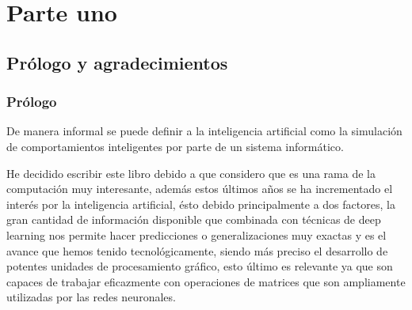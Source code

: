 \documentclass[11pt,fleqn]{book} %
\begin{document}


\pagestyle{empty} %

\tableofcontents %


\pagestyle{fancy} %


\part{Parte uno}



\chapter{Prólogo y agradecimientos}

\section{Prólogo}

De manera informal se puede definir a la inteligencia artificial como la simulación de comportamientos inteligentes por parte de un sistema informático.

He decidido escribir este libro debido a que considero que es una rama de la computación muy interesante, además estos últimos años se ha incrementado el interés por la inteligencia artificial, ésto debido principalmente a dos factores, la gran cantidad de información disponible que combinada con técnicas de deep learning nos permite hacer predicciones o generalizaciones muy exactas y es el avance que hemos tenido tecnológicamente, siendo más preciso el desarrollo de potentes unidades de procesamiento gráfico, esto último es relevante ya que son capaces de trabajar eficazmente con operaciones de matrices que son ampliamente utilizadas por las redes neuronales.
\end{document}
